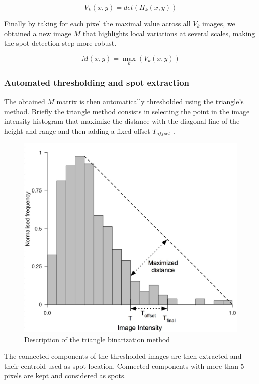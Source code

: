 \documentclass[12pt]{article}
\begin{document}
\begin{equation}
V_{k}(x,y) = det(H_{k}(x,y))
\end{equation}

Finally by taking for each pixel the maximal value across all $V_{k}$ images, we obtained a new image $M$ that highlights local variations at several scales, making the spot detection step more robust.

\begin{equation}
M(x,y) = \max_{k}(V_{k}(x,y))
\end{equation}

\subsubsection{Automated thresholding and spot extraction}

The obtained $M$ matrix is then automatically thresholded using the triangle's method. Briefly the triangle method consists in selecting the point in the image intensity histogram that maximize the distance with the diagonal line of the height and range and then adding a fixed offset $T_{offset}$ \citep{zack_automatic_1977}.  

 
\begin{figure}[!h]
	\begin{center}
		\includegraphics[width=0.7\linewidth]{Triangle_binarisation.jpeg}
		\caption{Description of the triangle binarization method}
		\label{Fig:Triangle_method}
	\end{center}
\end{figure}
 
The connected components of the thresholded images are then extracted and their centroid used as spot location. Connected components with more than 5 pixels are kept and considered as spots.
\end{document}
